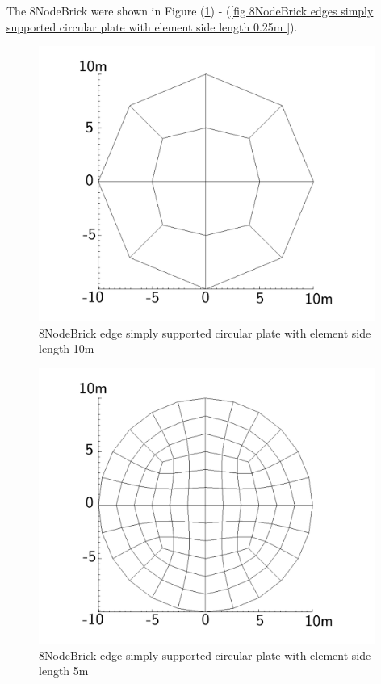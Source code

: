 \documentclass[fleqn,11pt]{article}
\begin{document}
The 8NodeBrick were shown in Figure (\ref{fig 8NodeBrick edges simply supported circular plate with element side length 10m }) - (\ref{fig 8NodeBrick edges simply supported circular plate with element side length 0.25m }). 



\begin{figure}[H]
  \centering
  \includegraphics[width=11cm]{../Figure-files/circular_plate1.pdf}
  \caption{8NodeBrick edge simply supported circular plate with element side length 10m }
  \label{fig 8NodeBrick edges simply supported circular plate with element side length 10m }
\end{figure}

\newpage

\begin{figure}[H]
  \centering
  \includegraphics[width=11cm]{../Figure-files/circular_plate2.pdf}
  \caption{8NodeBrick edge simply supported circular plate with element side length 5m }
  \label{fig 8NodeBrick edges simply supported circular plate with element side length 5m }
\end{figure}
\end{document}
